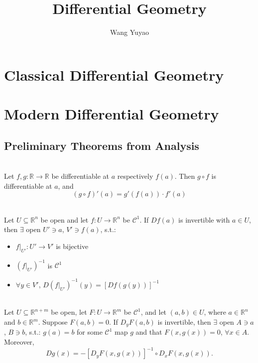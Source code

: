 \documentclass[11pt,openany]{book}
\title{Differential Geometry}
\author{Wang Yuyao}
\date{}
\theoremstyle{plain}
\theoremstyle{definition}
\theoremstyle{remark}
\theoremstyle{question}
\begin{document}
\frontmatter
\maketitle
\tableofcontents


\mainmatter
\setcounter{chapter}{-1}

\part{Classical Differential Geometry}




\part{Modern Differential Geometry}





\appendix

\chapter{Preliminary Theorems from Analysis}

\\
Let $f, g:\mathbb{R}\to\mathbb{R}$ be differentiable at $a$ respectively $f(a)$. Then $g\circ f$ is differentiable at $a$, and
\[
(g\circ f)'(a) = g'(f(a))\cdot f'(a)
\]

\\
Let $U\subseteq\mathbb{R}^n$ be open and let $f:U\to\mathbb{R}^n$ be $\mathcal{C}^1$. If $Df(a)$ is invertible with $a\in U$, then $\exists$ open $U'\ni a$, $V'\ni f(a)$, s.t.:
\begin{itemize}
\item $f|_{U'}: U'\to V'$ is bijective
\item $(f|_{U'})^{-1}$ is $\mathcal{C}^1$
\item $\forall y\in V'$, $D(f|_{U'})^{-1}(y) = \left[Df(g(y))\right]^{-1}$
\end{itemize}

\\
Let $U\subseteq\mathbb{R}^{n+m}$ be open, let $F:U\to\mathbb{R}^m$ be $\mathcal{C}^1$, and let $(a,b)\in U$, where $a\in\mathbb{R}^n$ and $b\in\mathbb{R}^m$. Suppose $F(a,b)=0$. If $D_yF(a,b)$ is invertible, then $\exists$ open $A\ni a$, $B\ni b$, s.t.: $g(a)=b$ for some $\mathcal{C}^1$ map $g$ and that $F(x, g(x))=0$, $\forall x\in A$. Moreover,
\[
Dg(x) = -\left[D_yF(x, g(x))\right]^{-1}\circ D_xF(x, g(x)).
\]
\end{document}
